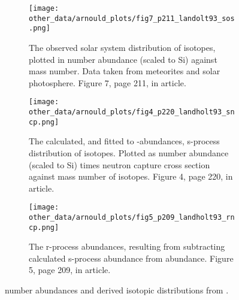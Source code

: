 \setlength{\subfiglength}{0.3\textwidth}
\begin{figure}
  \begin{subfigure}{\subfiglength}
    \centering
    \texttt{[image: other\_data/arnould\_plots/fig7\_p211\_landolt93\_sos.png]}
    \caption{The observed solar system distribution of isotopes, plotted in number abundance (scaled to Si) against mass number. Data taken from meteorites and solar photosphere.
    Figure 7, page 211, in article.}
  \end{subfigure}
  \begin{subfigure}{\subfiglength}
    \centering
    \texttt{[image: other\_data/arnould\_plots/fig4\_p220\_landholt93\_sncp.png]}            
    \caption{The calculated, and fitted to \sos-abundances, s-process distribution of isotopes. Plotted as number abundance (scaled to Si) times neutron capture cross section against mass number of isotopes.
    Figure 4, page 220, in article.}
  \end{subfigure}
  \begin{subfigure}{\subfiglength}
    \centering
    \texttt{[image: other\_data/arnould\_plots/fig5\_p209\_landholt93\_rncp.png]}
    \caption{The r-process abundances, resulting from subtracting calculated s-process abundance from \sos abundance.
    Figure 5, page 209, in article.}
  \end{subfigure}
  \caption{\label{fig:landholt-figures}
    \sos number abundances and derived isotopic distributions from .
  }
\end{figure}

\FloatBarrier
